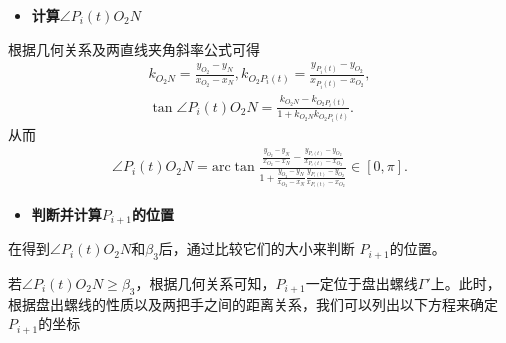 \documentclass{cumcmthesis}
\begin{document}
\begin{itemize}
    \item \textbf{计算$\angle P_{i}(t)O_2N$}
    \end{itemize}

\par 根据几何关系及两直线夹角斜率公式可得
\begin{gather}\label{1.........456}
k_{O_2N}=\frac{y_{O_2}-y_N}{x_{O_2}-x_N},k_{O_2P_i\left( t \right)}=\frac{y_{P_i\left( t \right)}-y_{O_2}}{x_{P_i\left( t \right)}-x_{O_2}},
\\
\tan \angle P_i(t)O_2N=\frac{k_{O_2N}-k_{O_2P_i\left( t \right)}}{1+k_{O_2N}k_{O_2P_i\left( t \right)}}.
\end{gather}
从而
\begin{align}\label{1.........457}
\angle P_i(t)O_2N=\mathrm{arc}\tan \frac{\frac{y_{O_2}-y_N}{x_{O_2}-x_N}-\frac{y_{P_i\left( t \right)}-y_{O_2}}{x_{P_i\left( t \right)}-x_{O_2}}}{1+\frac{y_{O_2}-y_N}{x_{O_2}-x_N}\frac{y_{P_i\left( t \right)}-y_{O_2}}{x_{P_i\left( t \right)}-x_{O_2}}}\in \left[ 0,\pi \right] .
\end{align}
\begin{itemize}
    \item \textbf{判断并计算$P_{i+1}$的位置}
    \end{itemize}
    \par 在得到$\angle P_{i}(t)O_{2}N$和$\beta_{3}$后，通过比较它们的大小来判断 $P_{i + 1} $的位置。
 
    \par 若$\angle P_{i}(t)O_{2}N \geq \beta_{3}$，根据几何关系可知，$P_{i + 1}$一定位于盘出螺线$\Gamma'$上。此时，根据盘出螺线的性质以及两把手之间的距离关系，我们可以列出以下方程来确定$ P_{i + 1} $的坐标
\end{document}
